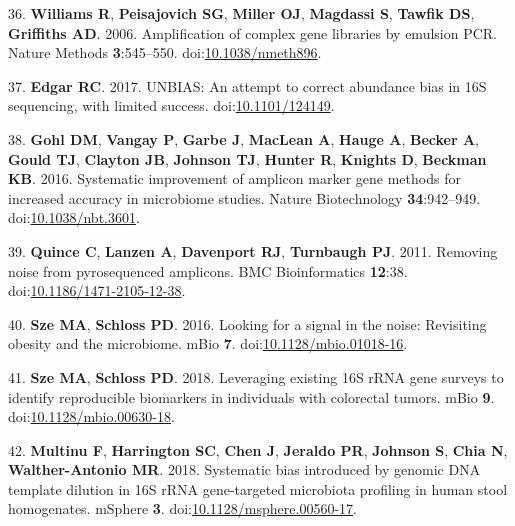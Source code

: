 \documentclass[11pt,]{article}
\begin{document}
\leavevmode\hypertarget{ref-Williams2006}{}%
36. \textbf{Williams R}, \textbf{Peisajovich SG}, \textbf{Miller OJ},
\textbf{Magdassi S}, \textbf{Tawfik DS}, \textbf{Griffiths AD}. 2006.
Amplification of complex gene libraries by emulsion PCR. Nature Methods
\textbf{3}:545--550.
doi:\href{https://doi.org/10.1038/nmeth896}{10.1038/nmeth896}.

\leavevmode\hypertarget{ref-Edgar2017}{}%
37. \textbf{Edgar RC}. 2017. UNBIAS: An attempt to correct abundance
bias in 16S sequencing, with limited success.
doi:\href{https://doi.org/10.1101/124149}{10.1101/124149}.

\leavevmode\hypertarget{ref-Gohl2016}{}%
38. \textbf{Gohl DM}, \textbf{Vangay P}, \textbf{Garbe J},
\textbf{MacLean A}, \textbf{Hauge A}, \textbf{Becker A}, \textbf{Gould
TJ}, \textbf{Clayton JB}, \textbf{Johnson TJ}, \textbf{Hunter R},
\textbf{Knights D}, \textbf{Beckman KB}. 2016. Systematic improvement of
amplicon marker gene methods for increased accuracy in microbiome
studies. Nature Biotechnology \textbf{34}:942--949.
doi:\href{https://doi.org/10.1038/nbt.3601}{10.1038/nbt.3601}.

\leavevmode\hypertarget{ref-Quince2011}{}%
39. \textbf{Quince C}, \textbf{Lanzen A}, \textbf{Davenport RJ},
\textbf{Turnbaugh PJ}. 2011. Removing noise from pyrosequenced
amplicons. BMC Bioinformatics \textbf{12}:38.
doi:\href{https://doi.org/10.1186/1471-2105-12-38}{10.1186/1471-2105-12-38}.

\leavevmode\hypertarget{ref-Sze2016}{}%
40. \textbf{Sze MA}, \textbf{Schloss PD}. 2016. Looking for a signal in
the noise: Revisiting obesity and the microbiome. mBio \textbf{7}.
doi:\href{https://doi.org/10.1128/mbio.01018-16}{10.1128/mbio.01018-16}.

\leavevmode\hypertarget{ref-Sze2018}{}%
41. \textbf{Sze MA}, \textbf{Schloss PD}. 2018. Leveraging existing 16S
rRNA gene surveys to identify reproducible biomarkers in individuals
with colorectal tumors. mBio \textbf{9}.
doi:\href{https://doi.org/10.1128/mbio.00630-18}{10.1128/mbio.00630-18}.

\leavevmode\hypertarget{ref-Multinu2018}{}%
42. \textbf{Multinu F}, \textbf{Harrington SC}, \textbf{Chen J},
\textbf{Jeraldo PR}, \textbf{Johnson S}, \textbf{Chia N},
\textbf{Walther-Antonio MR}. 2018. Systematic bias introduced by genomic
DNA template dilution in 16S rRNA gene-targeted microbiota profiling in
human stool homogenates. mSphere \textbf{3}.
doi:\href{https://doi.org/10.1128/msphere.00560-17}{10.1128/msphere.00560-17}.
\end{document}
